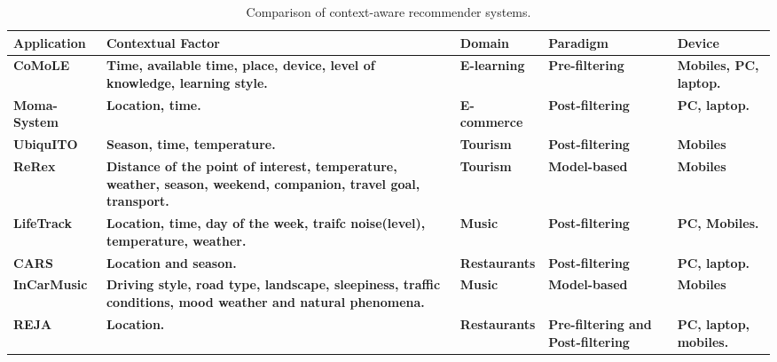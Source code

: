 \begin{sidewaystable}[]
  \caption{Comparison of context-aware recommender systems.}
    \label{tab:stateoftheart}
  \bigskip
    \centering\small\setlength\tabcolsep{2pt}
        \hspace*{-1cm}\begin{tabular}{p{3.5cm} p{6cm} p{4cm} p{3cm} p{3cm} }%
           \toprule
             \textbf{Application} &\textbf{Contextual Factor} &\textbf{Domain} &\textbf{Paradigm} &\textbf{Device}  \\ \hline

           \midrule
             \textbf{CoMoLE} & \textbf{Time, available time, place, device, level of knowledge, learning style.} & \textbf{E-learning} & \textbf{Pre-filtering} & \textbf{Mobiles, PC, laptop.}   \\ \hline 

             \textbf{Moma-System} & \textbf{Location, time.} & \textbf{E-commerce} & \textbf{Post-filtering} & \textbf{PC, laptop.}  \\ \hline

             \textbf{UbiquITO} & \textbf{Season, time, temperature.} & \textbf{Tourism} & \textbf{Post-filtering} & \textbf{Mobiles} \\ \hline

             \textbf{ReRex} & \textbf{Distance of the point of interest,  temperature, weather, season, weekend, companion, travel goal, transport.} & \textbf{Tourism} & \textbf{Model-based} & \textbf{Mobiles} \\ \hline

             \textbf{LifeTrack} & \textbf{Location, time, day of the week, traifc noise(level), temperature, weather.} & \textbf{Music} & \textbf{ Post-filtering} & \textbf{PC, Mobiles.} \\ \hline

             \textbf{CARS} & \textbf{Location and season.} & \textbf{Restaurants} & \textbf{Post-filtering} & \textbf{PC, laptop.} \\ \hline

             \textbf{InCarMusic} & \textbf{Driving style, road type, landscape, sleepiness, traffic conditions, mood weather and natural phenomena.} & \textbf{Music} & \textbf{Model-based} & \textbf{Mobiles} \\ \hline

            \textbf{REJA} & \textbf{Location.} & \textbf{Restaurants} & \textbf{Pre-filtering and Post-filtering} & \textbf{PC, laptop, mobiles.} \\ \hline


\end{tabular}
\end{sidewaystable}
